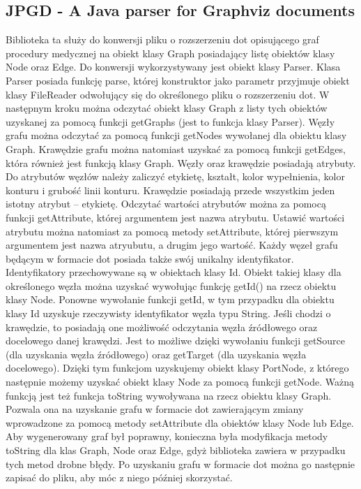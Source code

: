 \documentclass[oneside,a4paper]{book}
\begin{document}
\begin{spacing}{1.5}
\section{JPGD - A Java parser for Graphviz documents}

Biblioteka\cite{JPGD} ta służy do konwersji pliku o rozszerzeniu dot opisującego graf procedury medycznej na obiekt klasy Graph posiadający listę obiektów klasy Node oraz Edge. Do konwersji wykorzystywany jest obiekt klasy Parser. Klasa Parser posiada funkcję parse, której konstruktor jako parametr przyjmuje obiekt klasy FileReader odwołujący się do określonego pliku o rozszerzeniu dot. W następnym kroku można odczytać obiekt klasy Graph z listy tych obiektów uzyskanej za pomocą funkcji getGraphs (jest to funkcja klasy Parser). Węzły grafu można odczytać za pomocą funkcji getNodes wywołanej dla obiektu klasy Graph. Krawędzie grafu można natomiast uzyskać za pomocą funkcji getEdges, która również jest funkcją klasy Graph. Węzły oraz krawędzie posiadają atrybuty. Do atrybutów węzłów należy zaliczyć etykietę, kształt, kolor wypełnienia, kolor konturu i grubość linii konturu. Krawędzie posiadają przede wszystkim jeden istotny atrybut – etykietę. Odczytać wartości atrybutów można za pomocą funkcji getAttribute, której argumentem jest nazwa atrybutu. Ustawić wartości atrybutu można natomiast za pomocą metody setAttribute, której pierwszym argumentem jest nazwa atryubutu, a drugim jego wartość. Każdy węzeł grafu będącym w formacie dot posiada także swój unikalny identyfikator. Identyfikatory przechowywane są w obiektach klasy Id. Obiekt takiej klasy dla określonego węzła można uzyskać wywołując funkcję getId() na rzecz obiektu klasy Node. Ponowne wywołanie funkcji getId, w tym przypadku dla obiektu klasy Id uzyskuje rzeczywisty identyfikator węzła typu String. Jeśli chodzi o krawędzie, to posiadają one możliwość odczytania węzła źródłowego oraz docelowego danej krawędzi. Jest to możliwe dzięki wywołaniu funkcji getSource (dla uzyskania węzła źródłowego) oraz getTarget (dla uzyskania węzła docelowego). Dzięki tym funkcjom uzyskujemy obiekt klasy PortNode, z którego następnie możemy uzyskać obiekt klasy Node za pomocą funkcji getNode. Ważną funkcją jest też funkcja toString wywoływana na rzecz obiektu klasy Graph. Pozwala ona na uzyskanie grafu w formacie dot zawierającym zmiany wprowadzone za pomocą metody setAttribute dla obiektów klasy Node lub Edge. Aby wygenerowany graf był poprawny, konieczna była modyfikacja metody toString dla klas Graph, Node oraz Edge, gdyż biblioteka zawiera w przypadku tych metod drobne błędy. Po uzyskaniu grafu w formacie dot można go następnie zapisać do pliku, aby móc z niego później skorzystać.


\end{spacing}
\end{document}
